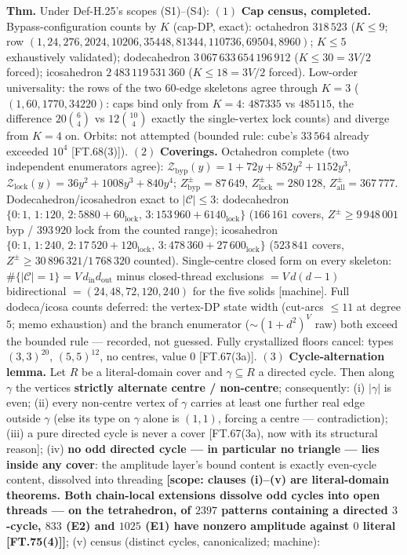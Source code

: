 \begin{theorem}\label{tag:FT-69}
\textbf{Thm.} Under Def-H.25's scopes (S1)–(S4): $(1)$ \textbf{Cap census, completed.} Bypass-configuration counts by $K$ (cap-DP, exact): octahedron $318\,523$ ($K\le9$; row $(1,24,276,2024,10206,35448,81344,110736,69504,8960)$; $K\le5$ exhaustively validated); dodecahedron $3\,067\,633\,654\,196\,912$ ($K\le30=3V/2$ forced); icosahedron $2\,483\,119\,531\,360$ ($K\le18=3V/2$ forced). Low-order universality: the rows of the two $60$-edge skeletons agree through $K=3$ ($(1,60,1770,34220)$: caps bind only from $K=4$: $487335$ vs $485115$, the difference $20\binom64$ vs $12\binom{10}4$ exactly the single-vertex lock counts) and diverge from $K=4$ on. Orbits: not attempted (bounded rule: cube's $33\,564$ already exceeded $10^4$ [FT.68(3)]). $(2)$ \textbf{Coverings.} Octahedron complete (two independent enumerators agree): $\mathcal Z_{\mathrm{byp}}(y)=1+72y+852y^2+1152y^3$, $\mathcal Z_{\mathrm{lock}}(y)=36y^2+1008y^3+840y^4$; $Z^{\pm}_{\mathrm{byp}}=87\,649$, $Z^{\pm}_{\mathrm{lock}}=280\,128$, $Z^{\pm}_{\mathrm{all}}=367\,777$. Dodecahedron/icosahedron exact to $|\mathcal C|\le3$: dodecahedron $\{0{:}1,\,1{:}120,\,2{:}5880{+}60_{\mathrm{lock}},\,3{:}153\,960{+}6140_{\mathrm{lock}}\}$ ($166\,161$ covers, $Z^{\pm}\ge9\,948\,001$ byp / $393\,920$ lock from the counted range); icosahedron $\{0{:}1,\,1{:}240,\,2{:}17\,520{+}120_{\mathrm{lock}},\,3{:}478\,360{+}27\,600_{\mathrm{lock}}\}$ ($523\,841$ covers, $Z^{\pm}\ge30\,896\,321/1\,768\,320$ counted). Single-centre closed form on every skeleton: $\#\{|\mathcal C|=1\}=V\,d_{\mathrm{in}}d_{\mathrm{out}}$ minus closed-thread exclusions $=V\,d(d{-}1)$ bidirectional $=(24,48,72,120,240)$ for the five solids [machine]. Full dodeca/icosa counts deferred: the vertex-DP state width (cut-arcs $\le11$ at degree $5$; memo exhaustion) and the branch enumerator ($\sim(1+d^2)^V$ raw) both exceed the bounded rule — recorded, not guessed. Fully crystallized floors cancel: types $(3,3)^{20}$, $(5,5)^{12}$, no centres, value $0$ [FT.67(3a)]. $(3)$ \textbf{Cycle-alternation lemma.} Let $R$ be a literal-domain cover and $\gamma\subseteq R$ a directed cycle. Then along $\gamma$ the vertices \textbf{strictly alternate centre / non-centre}; consequently: (i) $|\gamma|$ is even; (ii) every non-centre vertex of $\gamma$ carries at least one further real edge outside $\gamma$ (else its type on $\gamma$ alone is $(1,1)$, forcing a centre — contradiction); (iii) a pure directed cycle is never a cover [FT.67(3a), now with its structural reason]; (iv) \textbf{no odd directed cycle — in particular no triangle — lies inside any cover}: the amplitude layer's bound content is exactly even-cycle content, dissolved into threading \textbf{[scope: clauses (i)–(v) are literal-domain theorems. Both chain-local extensions dissolve odd cycles into open threads — on the tetrahedron, of $2397$ patterns containing a directed $3$-cycle, $833$ (E2) and $1025$ (E1) have nonzero amplitude against $0$ literal [FT.75(4)]]}; (v) census (distinct cycles, canonicalized; machine): 
\end{theorem}
